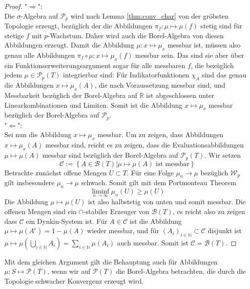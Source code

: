 \begin{proof}
"$\Rightarrow$": \\
Die $\sigma$-Algebra auf $\mathcal{P}_p$ wird nach Lemma \ref{thm:conv_char} von der gröbsten Topologie erzeugt, bezüglich der die Abbildungen $\pi_f: \mu \mapsto \mu(f)$ stetig sind für stetige $f$ mit $p$-Wachstum. Daher wird auch die Borel-Algebra von diesen Abbildungen erzeugt. Damit die Abbildung $\mu: x\mapsto \mu_x$ messbar ist, müssen also genau alle Abbildungen $\pi_f \circ \mu: x\mapsto \mu_x(f)$ messbar sein. Das sind sie aber über ein Funktionserweiterungsargument sogar für alle messbaren $f$, die bezüglich jedem $\mu \in \mathcal{P}_p(T)$ integrierbar sind: Für Indikatorfunktionen $\chi_A$ sind das genau die Abbildungen $x\mapsto \mu_x(A)$, die nach Voraussetzung messbar sind, und Messbarkeit bezüglich der Borel-Algebra auf $\mathbb{R}$ ist abgeschlossen unter Linearkombinationen und Limiten. Somit ist die Abbildung $x \mapsto \mu_x$ messbar bezüglich der Borel-Algebra auf $\mathcal{P}_p$. \\
"$\Leftarrow$": \\
Sei nun die Abbildung $x \mapsto \mu_x$ messbar. Um zu zeigen, dass Abbildungen $x\mapsto \mu_x(A)$ messbar sind, reicht es zu zeigen, dass die Evaluationsabbildungen $\mu \mapsto \mu(A)$ messbar sind bezüglich der Borel-Algebra auf $\mathcal{P}_p(T)$. Wir setzen
$$\mathcal{C}:=\left\{A \in \mathcal{B}(T) \vert \mu \mapsto \mu(A) \text{ ist messbar}\right\}$$
Betrachte zunächst offene Mengen $U\subset T$. Für eine Folge $\mu_n \rightarrow \mu$ bezüglich $\mathcal{W}_p$ gilt insbesondere $\mu_n\rightarrow \mu$ schwach. Somit gilt mit dem Portmonteau Theorem
$$\liminf_{n\rightarrow\infty}\mu_n(U) \geq \mu(U)$$
Die Abbildung $\mu \mapsto \mu(U)$ ist also halbstetig von unten und somit messbar. Die offenen Mengen sind ein $\cap$-stabiler Erzeuger von $\mathcal{B}(T)$, es reicht also zu zeigen dass $\mathcal{C}$ ein Dynkin-System ist. Für $A\in\mathcal{C}$ ist die Abbildung $\mu \mapsto \mu(A^c)=1-\mu(A)$ wieder messbar, und für $(A_i)_{i\in\mathbb{N}}\subset \mathcal{C}$ disjunkt ist 
$\mu\mapsto \mu(\bigcup_{i\in\mathbb{N}}A_i)=\sum_{i\in\mathbb{N}}\mu(A_i)$ auch messbar. Somit ist $\mathcal{C}=\mathcal{B}(T)$.
\end{proof}
\begin{remark}\label{rem:kernel_char_no_p}
Mit dem gleichen Argument gilt die Behauptung auch für Abbildungen $\mu: S \mapsto \mathcal{P}(T)$, wenn wir auf $\mathcal{P}(T)$ die Borel-Algebra betrachten, die durch die Topologie schwacher Konvergenz erzeugt wird.
\end{remark}
